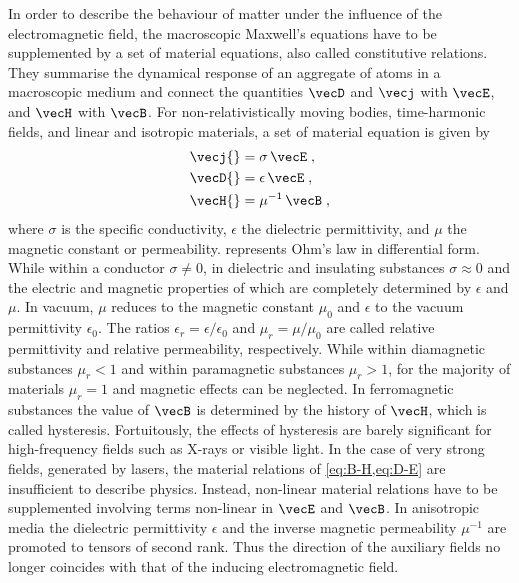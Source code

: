 \documentclass[
twoside,
openright,
titlepage,
numbers=noenddot,
headinclude,
fleqn,
a4paper,
footinclude=true,
cleardoublepage=empty,
abstractoff,
BCOR=5mm,
paper=a4,
fontsize=11pt,
british,ngerman,american,
]{scrreprt}
\begin{document}
In order to describe the behaviour of matter under the influence of
the electromagnetic field, the macroscopic Maxwell's equations have to
be supplemented by a set of material equations, also called
constitutive relations.  They summarise the dynamical response of an
aggregate of atoms in a macroscopic medium and connect the quantities
$\vecD$ and $\vecj$ with $\vecE$, and $\vecH$ with $\vecB$.  For
non-relativistically moving bodies, time-harmonic fields, and linear
and isotropic materials, a set of material equation is given by
\cite{BornWolf}
\begin{align}
  \label{eq:ohm} \vecj{}& = \sigma\,\vecE\;,\\
  \label{eq:D-E} \vecD{}& = \epsilon\,\vecE\;,\\
  \label{eq:B-H} \vecH{}& = \mu^{-1}\,\vecB\;,
\end{align}
where $\sigma$ is the specific conductivity, $\epsilon$ the dielectric
permittivity, and $\mu$ the magnetic constant or permeability.
 represents Ohm's law in differential form.  While within
a conductor $\sigma\neq 0$, in dielectric and insulating substances
$\sigma\approx0$ and the electric and magnetic properties of which are
completely determined by $\epsilon$ and $\mu$.  In vacuum, $\mu$
reduces to the magnetic constant $\mu_0$ and $\epsilon$ to the vacuum
permittivity $\epsilon_0$.  The ratios
$\epsilon_r=\epsilon/\epsilon_0$ and $\mu_r=\mu/\mu_0$ are called
relative permittivity and relative permeability, respectively.  While
within diamagnetic substances $\mu_r<1$ and within paramagnetic
substances $\mu_r>1$, for the majority of materials $\mu_r=1$ and
magnetic effects can be neglected.  In ferromagnetic substances the
value of $\vecB$ is determined by the history of $\vecH$, which is
called hysteresis. Fortuitously, the effects of hysteresis are barely
significant for high-frequency fields such as X-rays or visible light.
In the case of very strong fields, \eg{} generated by lasers, the
material relations of \cref{eq:B-H,eq:D-E} are insufficient to
describe physics.  Instead, non-linear material relations have to be
supplemented involving terms non-linear in $\vecE$ and $\vecB$.  In
anisotropic media the dielectric permittivity $\epsilon$ and the
inverse magnetic permeability $\mu^{-1}$ are promoted to tensors of
second rank.  Thus the direction of the auxiliary fields no longer
coincides with that of the inducing electromagnetic field.
\end{document}
